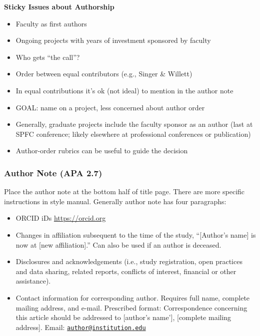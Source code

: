 \documentclass[
  english,
]{book}
\providecommand{\tightlist}{%
  \setlength{\itemsep}{0pt}\setlength{\parskip}{0pt}}
\begin{document}
\textbf{Sticky Issues about Authorship}

\begin{itemize}
\tightlist
\item
  Faculty as first authors
\item
  Ongoing projects with years of investment sponsored by faculty
\item
  Who gets ``the call''?
\item
  Order between equal contributors (e.g., Singer \& Willett)
\item
  In equal contributions it's ok (not ideal) to mention in the author note
\item
  GOAL: name on a project, less concerned about author order
\item
  Generally, graduate projects include the faculty sponsor as an author (last at SPFC conference; likely elsewhere at professional conferences or publication)
\item
  Author-order rubrics can be useful to guide the decision
\end{itemize}

\hypertarget{author-note-apa-2.7}{%
\subsubsection{Author Note (APA 2.7)}\label{author-note-apa-2.7}}

Place the author note at the bottom half of title page. There are more specific instructions in style manual. Generally author note has four paragraphs:

\begin{itemize}
\tightlist
\item
  ORCID iDs \url{https://orcid.org}
\item
  Changes in affiliation subsequent to the time of the study, ``{[}Author's name{]} is now at {[}new affiliation{]}.'' Can also be used if an author is deceased.
\item
  Disclosures and acknowledgements (i.e., study registration, open practices and data sharing, related reports, conflicts of interest, financial or other assistance).
\item
  Contact information for corresponding author. Requires full name, complete mailing address, and e-mail. Prescribed format: Correspondence concerning this article should be addressed to {[}author's name'{]}, {[}complete mailing address{]}. Email: \href{mailto:author@institution.edu}{\nolinkurl{author@institution.edu}}
\end{itemize}
\end{document}
